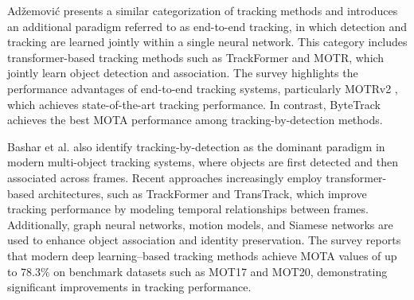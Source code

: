 Adžemović \cite{adzemovic} presents a similar categorization of tracking methods and introduces an additional paradigm referred to as end-to-end tracking, in which detection and tracking are learned jointly within a single neural network. This category includes transformer-based tracking methods such as TrackFormer and MOTR, which jointly learn object detection and association. The survey highlights the performance advantages of end-to-end tracking systems, particularly MOTRv2 \cite{}, which achieves state-of-the-art tracking performance. In contrast, ByteTrack achieves the best MOTA performance among tracking-by-detection methods.

Bashar et al. \cite{bashar} also identify tracking-by-detection as the dominant paradigm in modern multi-object tracking systems, where objects are first detected and then associated across frames. Recent approaches increasingly employ transformer-based architectures, such as TrackFormer and TransTrack, which improve tracking performance by modeling temporal relationships between frames. Additionally, graph neural networks, motion models, and Siamese networks are used to enhance object association and identity preservation. The survey reports that modern deep learning–based tracking methods achieve MOTA values of up to 78.3\% on benchmark datasets such as MOT17 and MOT20, demonstrating significant improvements in tracking performance.